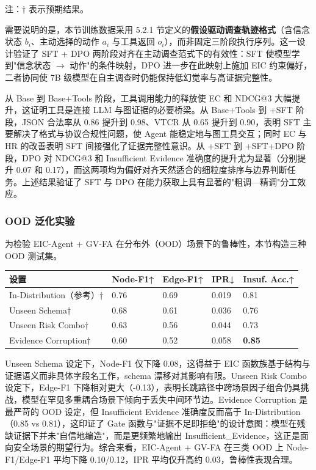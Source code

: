 \documentclass[a4paper,12pt]{ctexart}
\begin{document}
注：† 表示预期结果。

需要说明的是，本节训练数据采用 5.2.1 节定义的\textbf{假设驱动调查轨迹格式}（含信念状态 $b_i$、主动选择的动作 $a_i$ 与工具返回 $o_i$），而非固定三阶段执行序列。这一设计验证了 SFT + DPO 两阶段对齐在主动调查范式下的有效性：SFT 使模型学到"信念状态 $\to$ 动作"的条件映射，DPO 进一步在此映射上施加 EIC 约束偏好，二者协同使 7B 级模型在自主调查时仍能保持低幻觉率与高证据完整性。

从 Base 到 Base+Tools 阶段，工具调用能力的释放使 EC 和 NDCG@3 大幅提升，这证明工具是连接 LLM 与图证据的必要桥梁。从 Base+Tools 到 +SFT 阶段，JSON 合法率从 0.86 提升到 0.98、VTCR 从 0.65 提升到 0.90，表明 SFT 主要解决了格式与协议合规性问题，使 Agent 能稳定地与图工具交互；同时 EC 与 HR 的改善表明 SFT 间接强化了证据完整性意识。从 +SFT 到 +SFT+DPO 阶段，DPO 对 NDCG@3 和 Insufficient Evidence 准确度的提升尤为显著（分别提升 0.07 和 0.17），而这两项均为偏好对齐天然适合的细粒度排序与边界判断任务。上述结果验证了 SFT 与 DPO 在能力获取上具有显著的"粗调—精调"分工效应。

\subsubsection{OOD 泛化实验}

为检验 EIC-Agent + GV-FA 在分布外（OOD）场景下的鲁棒性，本节构造三种 OOD 测试集。

\begin{table}[htbp]
\centering
\small
\setlength{\tabcolsep}{4pt}
\begin{tabular}{|l|l|l|l|l|}
\hline
\textbf{设置} & \textbf{Node-F1↑} & \textbf{Edge-F1↑} & \textbf{IPR↓} & \textbf{Insuf. Acc.↑} \\
\hline
In-Distribution（参考）† & 0.76 & 0.69 & 0.019 & 0.81 \\
\hline
Unseen Schema† & 0.68 & 0.61 & 0.036 & 0.76 \\
\hline
Unseen Risk Combo† & 0.63 & 0.56 & 0.044 & 0.73 \\
\hline
Evidence Corruption† & 0.60 & 0.52 & 0.058 & \textbf{0.85} \\
\hline
\end{tabular}
\end{table}

Unseen Schema 设定下，Node-F1 仅下降 0.08，这得益于 EIC 函数族基于结构与证据语义而非具体字段名工作，schema 漂移对其影响有限。Unseen Risk Combo 设定下，Edge-F1 下降相对更大（-0.13），表明长跳路径中跨场景因子组合仍具挑战，模型在罕见多重耦合场景下倾向于丢失中间环节边。Evidence Corruption 是最严苛的 OOD 设定，但 Insufficient Evidence 准确度反而高于 In-Distribution（0.85 vs 0.81），这印证了 Gate 函数与"证据不足即拒绝"的设计意图：模型在残缺证据下并未"自信地编造"，而是更频繁地输出 Insufficient\_Evidence，这正是面向安全场景的期望行为。综合来看，EIC-Agent + GV-FA 在三类 OOD 上 Node-F1/Edge-F1 平均下降 0.10/0.12，IPR 平均仅升高约 0.03，鲁棒性表现合理。
\end{document}
